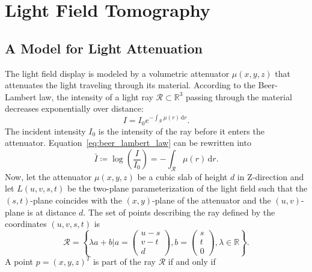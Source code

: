 \chapter{Light Field Tomography}

\section{A Model for Light Attenuation}
\label{sec:light_attenuation_model}

The light field display is modeled by a volumetric attenuator $\mu(x, y, z)$ that attenuates the light traveling through its material.
According to the Beer-Lambert law, the intensity of a light ray $\mathcal{R} \subset \mathbb{R}^3$ passing through the material decreases exponentially over distance:
\begin{equation}\label{eq:beer_lambert_law}
I = I_0 e^{-\int_\mathcal{R} \mu(r) \, \mathrm{d}r }.
\end{equation}
The incident intensity $I_0$ is the intensity of the ray before it enters the attenuator.
Equation~\ref{eq:beer_lambert_law} can be rewritten into 
\begin{equation}\label{eq:log_beer_lambert_law}
\bar{I} \coloneqq \log \left( \frac{I}{I_0} \right) = -\int_\mathcal{R} \mu(r) \, \mathrm{d}r.
\end{equation} 
Now, let the attenuator $\mu(x, y, z)$ be a cubic slab of height $d$ in Z-direction and let $L(u, v, s, t)$ be the two-plane parameterization of the light field such that the $(s, t)$-plane coincides with the $(x, y)$-plane of the attenuator and the $(u, v)$-plane is at distance $d$.
The set of points describing the ray defined by the coordinates $(u, v, s, t)$ is
\begin{equation}
\mathcal{R} = \left\{ \lambda a + b 
\mathrel{\bigg|} a = 
\begin{pmatrix}
u - s \\ 
v - t \\ 
d
\end{pmatrix}, 
b = 
\begin{pmatrix}
s \\ 
t \\ 
0
\end{pmatrix},
\lambda \in \mathbb{R} 
\right\}.
\end{equation}
A point $p = (x, y, z)^T$ is part of the ray $\mathcal{R}$ if and only if
